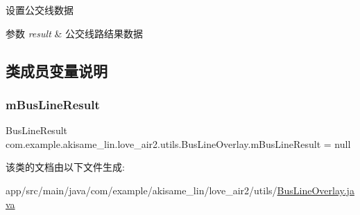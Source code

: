 设置公交线数据


\begin{DoxyParams}{参数}
{\em result} & 公交线路结果数据 \\
\hline
\end{DoxyParams}


\subsection{类成员变量说明}
\mbox{\label{classcom_1_1example_1_1akisame__lin_1_1love__air2_1_1utils_1_1_bus_line_overlay_a323eb1d31b4b75b16dad16e83c3a4029}} 
\subsubsection{\texorpdfstring{mBusLineResult}{mBusLineResult}}
{\footnotesize\ttfamily Bus\+Line\+Result com.\+example.\+akisame\+\_\+lin.\+love\+\_\+air2.\+utils.\+Bus\+Line\+Overlay.\+m\+Bus\+Line\+Result = null\hspace{0.3cm}{\ttfamily [private]}}



该类的文档由以下文件生成\+:\begin{DoxyCompactItemize}
\item 
app/src/main/java/com/example/akisame\+\_\+lin/love\+\_\+air2/utils/\mbox{\hyperlink{_bus_line_overlay_8java}{Bus\+Line\+Overlay.\+java}}\end{DoxyCompactItemize}
